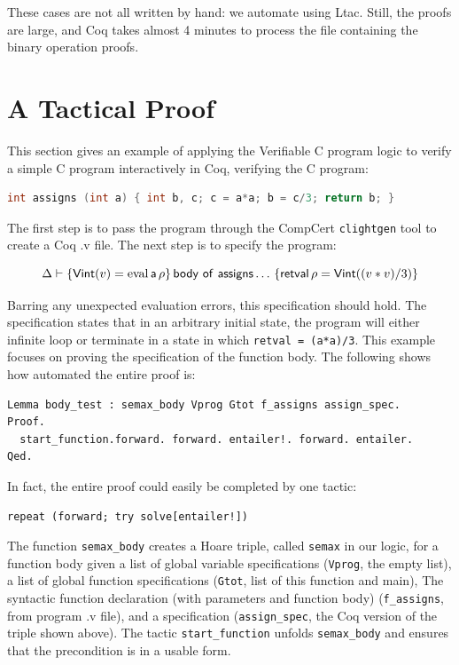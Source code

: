 \documentclass{puthesis}
\begin{document}
These cases are not all written by hand: we automate using Ltac.
Still, the proofs are large, and Coq takes almost 4 minutes to process
the file containing the binary operation proofs.


\section{A Tactical Proof}
\label{sec:example}
This section gives an example of applying the Verifiable C program logic to
verify a simple C program interactively in Coq, verifying the C
program:

\begin{lstlisting}[language=c]
int assigns (int a) { int b, c; c = a*a; b = c/3; return b; }
\end{lstlisting}

The first step is to pass the program through the CompCert
\lstinline|clightgen| tool to create a Coq .v file. The next step is
to specify the program:

\[\Delta \vdash \{\mathsf{Vint}(v)=\mathrm{eval}\,\mathsf{a}\,\rho\}\,\mathsf{body~of~assigns}\ldots\,\{\mathsf{retval}\,\rho = \mathsf{Vint}((v * v) /
3)\}\]

Barring any unexpected evaluation errors, this specification should hold.
The specification states that in an arbitrary initial state, the program will either
infinite loop or terminate in a state in which \lstinline|retval = (a*a)/3|. This
example focuses on proving the specification of the function
body. The following shows
how automated the entire proof is:

\begin{lstlisting}
Lemma body_test : semax_body Vprog Gtot f_assigns assign_spec.
Proof. 
  start_function.forward. forward. entailer!. forward. entailer. 
Qed.
\end{lstlisting}

In fact, the entire proof could easily be completed by one tactic:

\begin{lstlisting}
repeat (forward; try solve[entailer!])
\end{lstlisting}

The function \lstinline|semax_body| creates a Hoare triple, called
\lstinline|semax| in our logic, for a
function body given a list of global variable specifications
(\lstinline|Vprog|, the empty list), a list of global function
specifications (\lstinline|Gtot|, list of this function and main), The
syntactic function declaration (with parameters and function body)
(\lstinline|f_assigns|, from program .v file), and a
specification (\lstinline|assign_spec|, the Coq version of the triple
shown above). The tactic \lstinline|start_function| unfolds
\lstinline|semax_body| and ensures that the precondition is in a
usable form.  
\end{document}
